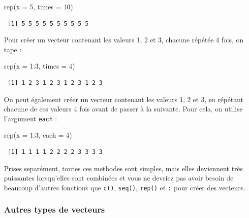 \documentclass[
  a4paper,
  DIV=11,
  numbers=noendperiod,
  oneside]{scrreprt}
\newenvironment{Shaded}{}{}
\newcommand{\AttributeTok}[1]{\textcolor[rgb]{0.84,0.23,0.29}{#1}}
\newcommand{\DecValTok}[1]{\textcolor[rgb]{0.00,0.36,0.77}{#1}}
\newcommand{\FunctionTok}[1]{\textcolor[rgb]{0.44,0.26,0.76}{#1}}
\newcommand{\NormalTok}[1]{\textcolor[rgb]{0.14,0.16,0.18}{#1}}
\newcommand{\SpecialCharTok}[1]{\textcolor[rgb]{0.00,0.36,0.77}{#1}}
\begin{document}
\begin{Shaded}
\begin{Highlighting}[]
\FunctionTok{rep}\NormalTok{(}\AttributeTok{x =} \DecValTok{5}\NormalTok{, }\AttributeTok{times =} \DecValTok{10}\NormalTok{)}
\end{Highlighting}
\end{Shaded}

\begin{verbatim}
 [1] 5 5 5 5 5 5 5 5 5 5
\end{verbatim}

Pour créer un vecteur contenant les valeurs 1, 2 et 3, chacune répétée 4
fois, on tape :

\begin{Shaded}
\begin{Highlighting}[]
\FunctionTok{rep}\NormalTok{(}\AttributeTok{x =} \DecValTok{1}\SpecialCharTok{:}\DecValTok{3}\NormalTok{, }\AttributeTok{times =} \DecValTok{4}\NormalTok{)}
\end{Highlighting}
\end{Shaded}

\begin{verbatim}
 [1] 1 2 3 1 2 3 1 2 3 1 2 3
\end{verbatim}

On peut également créer un vecteur contenant les valeurs 1, 2 et 3, en
répétant chacune de ces valeurs 4 fois avant de passer à la suivante.
Pour cela, on utilise l'argument \texttt{each} :

\begin{Shaded}
\begin{Highlighting}[]
\FunctionTok{rep}\NormalTok{(}\AttributeTok{x =} \DecValTok{1}\SpecialCharTok{:}\DecValTok{3}\NormalTok{, }\AttributeTok{each =} \DecValTok{4}\NormalTok{)}
\end{Highlighting}
\end{Shaded}

\begin{verbatim}
 [1] 1 1 1 1 2 2 2 2 3 3 3 3
\end{verbatim}

Prises separément, toutes ces methodes sont simples, mais elles
deviennent très puissantes lorsqu'elles sont combinées et vous ne
devriez pas avoir besoin de beaucoup d'autres fonctions que
\texttt{c()}, \texttt{seq()}, \texttt{rep()} et \texttt{:} pour créer
des vecteurs.

\subsubsection{Autres types de vecteurs}\label{autres-types-de-vecteurs}
\end{document}
